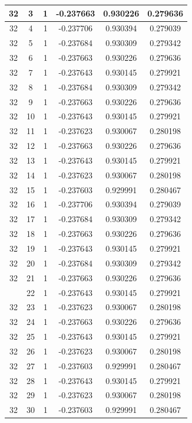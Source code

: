 \documentclass[12pt,a4paper]{article}
\numberwithin{equation}{section}
\numberwithin{figure}{section}
\numberwithin{table}{section}
\begin{document}
\begin{longtable}{|c|c|c|c|c|c|}
32 & 3 & 1 & -0.237663 & 0.930226 & 0.279636 \\ \hline
32 & 4 & 1 & -0.237706 & 0.930394 & 0.279039 \\ \hline
32 & 5 & 1 & -0.237684 & 0.930309 & 0.279342 \\ \hline
32 & 6 & 1 & -0.237663 & 0.930226 & 0.279636 \\ \hline
32 & 7 & 1 & -0.237643 & 0.930145 & 0.279921 \\ \hline
32 & 8 & 1 & -0.237684 & 0.930309 & 0.279342 \\ \hline
32 & 9 & 1 & -0.237663 & 0.930226 & 0.279636 \\ \hline
32 & 10 & 1 & -0.237643 & 0.930145 & 0.279921 \\ \hline
32 & 11 & 1 & -0.237623 & 0.930067 & 0.280198 \\ \hline
32 & 12 & 1 & -0.237663 & 0.930226 & 0.279636 \\ \hline
32 & 13 & 1 & -0.237643 & 0.930145 & 0.279921 \\ \hline
32 & 14 & 1 & -0.237623 & 0.930067 & 0.280198 \\ \hline
32 & 15 & 1 & -0.237603 & 0.929991 & 0.280467 \\ \hline
32 & 16 & 1 & -0.237706 & 0.930394 & 0.279039 \\ \hline
32 & 17 & 1 & -0.237684 & 0.930309 & 0.279342 \\ \hline
32 & 18 & 1 & -0.237663 & 0.930226 & 0.279636 \\ \hline
32 & 19 & 1 & -0.237643 & 0.930145 & 0.279921 \\ \hline
32 & 20 & 1 & -0.237684 & 0.930309 & 0.279342 \\ \hline
32 & 21 & 1 & -0.237663 & 0.930226 & 0.279636 \\ \hline
\pagebreak
32 & 22 & 1 & -0.237643 & 0.930145 & 0.279921 \\ \hline
32 & 23 & 1 & -0.237623 & 0.930067 & 0.280198 \\ \hline
32 & 24 & 1 & -0.237663 & 0.930226 & 0.279636 \\ \hline
32 & 25 & 1 & -0.237643 & 0.930145 & 0.279921 \\ \hline
32 & 26 & 1 & -0.237623 & 0.930067 & 0.280198 \\ \hline
32 & 27 & 1 & -0.237603 & 0.929991 & 0.280467 \\ \hline
32 & 28 & 1 & -0.237643 & 0.930145 & 0.279921 \\ \hline
32 & 29 & 1 & -0.237623 & 0.930067 & 0.280198 \\ \hline
32 & 30 & 1 & -0.237603 & 0.929991 & 0.280467 \\ \hline

\end{longtable}
\end{document}
